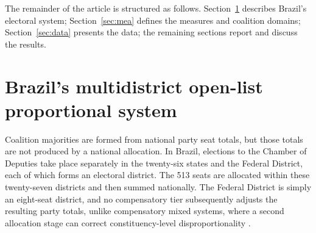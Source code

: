 \documentclass[11pt]{article}
\begin{document}


The remainder of the article is structured as follows. Section~\ref{sec:brazil-system} describes Brazil's electoral system;
Section~\ref{sec:mea} defines the measures and coalition domains;
Section~\ref{sec:data} presents the data; the remaining sections report and
discuss the results.


\section{Brazil's multidistrict open-list proportional system}
\label{sec:brazil-system}

Coalition majorities are formed from national party seat totals, but those
totals are not produced by a national allocation. In Brazil, elections to the
Chamber of Deputies take place separately in the twenty-six states and the
Federal District, each of which forms an electoral district. The 513 seats are
allocated within these twenty-seven districts and then summed nationally. The
Federal District is simply an eight-seat district, and no compensatory tier
subsequently adjusts the resulting party totals, unlike compensatory mixed
systems, where a second allocation stage can correct constituency-level
disproportionality \parencite{FlisGrofmanKaminski2025Introduction, salamon2026mixed}.
\end{document}
